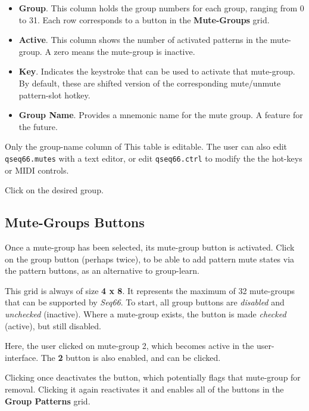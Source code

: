       \begin{itemize}
         \item \textbf{Group}.
            This column holds the group numbers for each group, ranging from 0
            to 31.  Each row corresponds to a button in the
            \textbf{Mute-Groups} grid.
         \item \textbf{Active}.
            This column shows the number of activated patterns in the
            mute-group.  A zero means the mute-group is inactive.
         \item \textbf{Key}.
            Indicates the keystroke that can be used to activate that
            mute-group.
            By default, these are shifted version of the corresponding
            mute/unmute pattern-slot hotkey.
         \item \textbf{Group Name}.
            Provides a mnemonic name for the mute group.  A feature for the
            future.
      \end{itemize}

   Only the group-name column of This table is editable.
   The user can also edit \texttt{qseq66.mutes} with a text editor, or
   edit \texttt{qseq66.ctrl} to modify the the hot-keys or MIDI controls.

   Click on the desired group.

\subsection{Mute-Groups Buttons}
\label{sec:mutes_mute_groups_buttons}

   Once a mute-group has been selected, its mute-group button is activated.
   Click on the group button (perhaps twice), to be able to add pattern
   mute states via the pattern buttons,
   as an alternative to group-learn.

   This grid is always of size \textbf{4 x 8}.
   It represents the maximum of 32
   mute-groups that can be supported by \textsl{Seq66}.
   To start, all group buttons are \textsl{disabled} and
   \textsl{unchecked} (inactive).
   Where a mute-group exists, the button is made \textsl{checked} (active),
   but still disabled.

   Here, the user clicked on mute-group 2, which becomes active in the
   user-interface.
   The \textbf{2} button is also enabled, and can be clicked.

   Clicking once deactivates the button, which potentially flags that
   mute-group for removal.
   Clicking it again reactivates it and
   enables all of the
   buttons in the \textbf{Group Patterns} grid.

